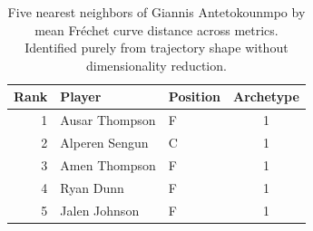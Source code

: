 \begin{table}[htbp]
  \centering\small
  \begin{tabular}{rllc}
    \toprule
    Rank & Player & Position & Archetype \\
    \midrule
    1 & Ausar Thompson & F & 1 \\
    2 & Alperen Sengun & C & 1 \\
    3 & Amen Thompson & F & 1 \\
    4 & Ryan Dunn & F & 1 \\
    5 & Jalen Johnson & F & 1 \\
    \bottomrule
  \end{tabular}
  \caption{Five nearest neighbors of Giannis Antetokounmpo by mean Fr\'{e}chet curve distance across metrics. Identified purely from trajectory shape without dimensionality reduction.}
  \label{tab:Giannis_Antetokounmpo_frechet_curve_neighbors}
\end{table}

